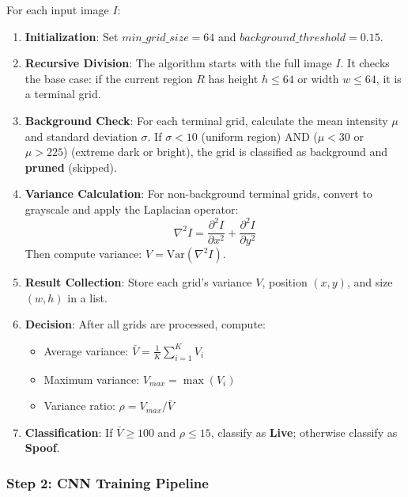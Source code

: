 \documentclass[conference]{IEEEtran}
\begin{document}
For each input image $I$:

\begin{enumerate}
    \item \textbf{Initialization}: Set $min\_grid\_size = 64$ and $background\_threshold = 0.15$.
    
    \item \textbf{Recursive Division}: The algorithm starts with the full image $I$. It checks the base case: if the current region $R$ has height $h \leq 64$ or width $w \leq 64$, it is a terminal grid.
    
    \item \textbf{Background Check}: For each terminal grid, calculate the mean intensity $\mu$ and standard deviation $\sigma$. If $\sigma < 10$ (uniform region) AND ($\mu < 30$ or $\mu > 225$) (extreme dark or bright), the grid is classified as background and \textbf{pruned} (skipped).
    
    \item \textbf{Variance Calculation}: For non-background terminal grids, convert to grayscale and apply the Laplacian operator:
    \begin{equation}
        \nabla^2 I = \frac{\partial^2 I}{\partial x^2} + \frac{\partial^2 I}{\partial y^2}
    \end{equation}
    Then compute variance: $V = \text{Var}(\nabla^2 I)$.
    
    \item \textbf{Result Collection}: Store each grid's variance $V$, position $(x, y)$, and size $(w, h)$ in a list.
    
    \item \textbf{Decision}: After all grids are processed, compute:
    \begin{itemize}
        \item Average variance: $\bar{V} = \frac{1}{K}\sum_{i=1}^{K} V_i$
        \item Maximum variance: $V_{max} = \max(V_i)$
        \item Variance ratio: $\rho = V_{max} / \bar{V}$
    \end{itemize}
    
    \item \textbf{Classification}: If $\bar{V} \geq 100$ and $\rho \leq 15$, classify as \textbf{Live}; otherwise classify as \textbf{Spoof}.
\end{enumerate}

\subsubsection{Step 2: CNN Training Pipeline}
\end{document}
